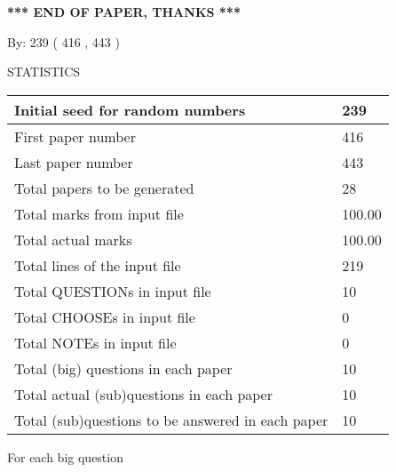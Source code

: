 \documentclass{ctexart}
\begin{document}
\vspace{1.0in} 
{\textbf{\large{ *** END OF PAPER, THANKS *** }}} 
   
   
\hspace{1.0in} By: 
 239 ( 416 ,  443 )
   
   
   
\vspace{0.2in}
\vspace{0.2in}
   
   
 \newpage
\setcounter{page}{1} 
   
   
 {\LARGE{STATISTICS}}
   
\vspace{0.2in}
   
 \begin{tabular}{|l|l|}
 \hline
 Initial seed for random numbers & 239  \\
\hline
 First paper number & 416  \\
\hline
 Last  paper number & 443  \\
\hline
 Total papers to be generated & 28  \\
\hline
Total marks from input file & 100.00 \\
\hline
Total actual marks & 100.00 \\
\hline
 Total lines of the input file & 219  \\
 \hline
 Total QUESTIONs in input file & 10  \\
\hline
 Total CHOOSEs in input file & 0  \\
\hline
 Total NOTEs in input file & 0  \\
\hline
 Total (big) questions in each paper & 10  \\
\hline
 Total actual (sub)questions in each paper & 10  \\
\hline
 Total (sub)questions to be answered in each paper & 10  \\
\hline
 \end{tabular}
   
   
 \newpage
   
{\LARGE{For each big question}}
   
   
\vspace{0.2in}
   
\end{document}
